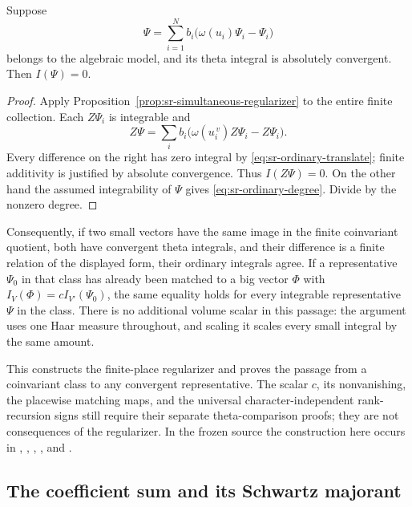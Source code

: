 \begin{srcorollary}
\label{cor:sr-integrable-relations}
Suppose
\[
 \Psi=\sum_{i=1}^{N}b_i\bigl(\omega(u_i)\Psi_i-\Psi_i\bigr)
\]
belongs to the algebraic model, and its theta integral is absolutely
convergent.  Then \(I(\Psi)=0\).
\end{srcorollary}

\begin{proof}
Apply Proposition~\ref{prop:sr-simultaneous-regularizer} to the entire
finite collection.  Each \(Z\Psi_i\) is integrable and
\[
 Z\Psi=\sum_i b_i
 \bigl(\omega(u_i^{\,v})Z\Psi_i-Z\Psi_i\bigr).
\]
Every difference on the right has zero integral by
\eqref{eq:sr-ordinary-translate}; finite additivity is justified by
absolute convergence.  Thus \(I(Z\Psi)=0\).
On the other hand the assumed integrability of \(\Psi\) gives
\eqref{eq:sr-ordinary-degree}.  Divide by the nonzero degree.
\end{proof}

Consequently, if two small vectors have the same image in the finite
coinvariant quotient, both have convergent theta integrals, and their
difference is a finite relation of the displayed form, their ordinary
integrals agree.  If a representative \(\Psi_0\) in that class has
already been matched to a big vector \(\Phi\) with
\(I_V(\Phi)=cI_{V'}(\Psi_0)\), the same equality holds for every
integrable representative \(\Psi\) in the class.  There is no additional
volume scalar in this passage: the argument uses one Haar measure
throughout, and scaling it scales every small integral by the same
amount.

This constructs the finite-place regularizer and proves the passage
from a coinvariant class to any convergent representative.  The scalar
\(c\), its nonvanishing, the placewise matching maps, and the universal
character-independent rank-recursion signs still require their
separate theta-comparison proofs; they are not consequences of the
regularizer.  In the frozen source the construction here occurs in
,
,
,
, and
.

\subsection{The coefficient sum and its Schwartz majorant}
\label{subsec:sr-theta-coefficient-proof}


